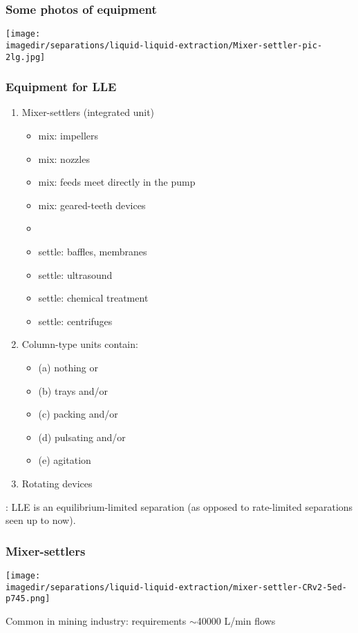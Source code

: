 \begin{frame}\frametitle{Some photos of equipment}
	\begin{center}
		\texttt{[image: \\imagedir/separations/liquid-liquid-extraction/Mixer-settler-pic-2lg.jpg]}
	\end{center}
\end{frame}

\begin{frame}\frametitle{Equipment for LLE}	
	\begin{enumerate}
		\item	Mixer-settlers (integrated unit)
		\begin{itemize}
			\item	mix: impellers
			\item	mix: nozzles
			\item	mix: feeds meet directly in the pump
			\item	mix: geared-teeth devices
			\item	{\color{myOrange}{main aim: good contact; avoid droplets smaller than 2 \micron}}
			\item	settle: baffles, membranes
			\item	settle: ultrasound
			\item	settle: chemical treatment
			\item	settle: centrifuges
		\end{itemize}
		\item	Column-type units contain:
			\begin{itemize}
				\item	(a) nothing or
				\item	(b) trays and/or
				\item	(c) packing and/or
				\item	(d) pulsating and/or
				\item	(e) agitation
			\end{itemize}
		\item	Rotating devices
	\end{enumerate}
	{\color{myRed}{Important point}}: LLE is an equilibrium-limited separation (as opposed to rate-limited separations seen up to now).
\end{frame}

\begin{frame}\frametitle{Mixer-settlers}
	\begin{center}
		\texttt{[image: \\imagedir/separations/liquid-liquid-extraction/mixer-settler-CRv2-5ed-p745.png]}
	\end{center}
	Common in mining industry: requirements $\sim$40000 L/min flows
\end{frame}

